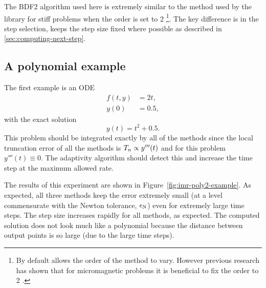 The BDF2 algorithm used here is extremely similar to the method used by the \cvode library for stiff problems when the order is set to 2 \cite{cvode-manual}\footnote{By default \cvode allows the order of the method to vary.
  However previous research has shown that for micromagnetic problems it is beneficial to fix the order to 2 \cite{Suess2002}.}.
The key difference is in the step selection, \cvode keeps the step size fixed where possible as described in \cref{sec:computing-next-step}.

\subsection{A polynomial example}
\label{sec:imr-polynomial-example}

The first example is an ODE
\begin{equation}
  \begin{aligned}
    f(t,y) &= 2t, \\
    y(0) &= 0.5,
  \end{aligned}
\end{equation}
with the exact solution
\begin{equation}
  y(t) = t^2 + 0.5.
\end{equation}
This problem should be integrated exactly by all of the methods since the local truncation error of all the methods is $T_n \propto y'''(t)$ and for this problem $y'''(t) \equiv 0$.
The adaptivity algorithm should detect this and increase the time step at the maximum allowed rate.

The results of this experiment are shown in Figure~\ref{fig:imr-poly2-example}.
As expected, all three methods keep the error extremely small (at a level commensurate with the Newton tolerance, $\epsilon_{\mathrm{N}}$) even for extremely large time steps.
The step size increases rapidly for all methods, as expected.
The computed solution does not look much like a polynomial because the distance between output points is so large (due to the large time steps).

